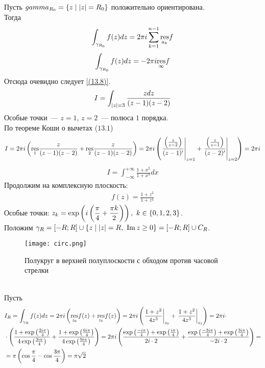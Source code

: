 Пусть $gamma_{R_0} = \{z \mid \left|{z}\right| = R_0\}$ положительно ориентирована.
\\
Тогда
\begin{align*}
  \int_{\gamma_{R_0}}f(z)dz = 2 \pi i \sum_{k=1}^{n-1} \underset{a_k}{\mathrm{res}}f
\end{align*}
\begin{align*}
  \int_{\gamma_{R_0}}f(z)dz = -2 \pi i \underset{\infty}{\mathrm{res}}f
\end{align*}
Отсюда очевидно следует \eqref{(13.8)}.
\Example
\begin{align*}
  I = \int_{\left|{z}\right| = 3}\frac{z dz}{(z-1)(z-2)}
\end{align*}
Особые точки~--- $z=1$, $z=2$~--- полюса $1$ порядка.
\\
По теореме Коши о вычетах ($13.1$)
\begin{align*}
  I = 2 \pi i \left( \underset{1}{\mathrm{res}} \frac{z}{(z-1)(z-2)} +  \underset{2}{\mathrm{res}} \frac{z}{(z-1)(z-2)}\right) = 2 \pi i \left( \left. \frac{\left( \frac{z}{z-2} \right)}{(z-1)'} \right|_{z=1} +  \left. \frac{\left( \frac{z}{z-1} \right)}{(z-2)'} \right|_{z=2} \right) = 2 \pi i
\end{align*}
\Example
\begin{align*}
  I = \int_{-\infty}^{+\infty}\frac{1+x^2}{1+x^4}dx
\end{align*}
Продолжим на комплексную плоскость:
\begin{align*}
  f(z) = \frac{1+z^2}{1+z^4}
\end{align*}
Особые точки: $z_k = \exp \left( i \left( \displaystyle \frac{\pi}{4} + \displaystyle \frac{\pi
          k}{2} \right) \right), \ k \in\{0, 1, 2, 3\}$.
\\
Положим $\gamma_R = \left[ -R;R \right] \cup \{z \mid \left|{z}\right| = R, \ \mathrm{Im}\, z \geq
0 \} = \left[ -R;R \right] \cup C_R$.
\begin{figure}[h!]
		\centering
		\texttt{[image: circ.png]}
    \caption{Полукруг в верхней полуплоскости с обходом против часовой стрелки}
		\label{fig:13.1}
\end{figure}
\\
Пусть 
\begin{align*}
  & I_R = \int_{\gamma_R}f(z)dz = 2 \pi i \left( \underset{z_0}{\mathrm{res}} f(z) +  \underset{z_1}{\mathrm{res}} f(z)\right) = 2 \pi i \left( \left.\frac{1+z^2}{4z^3}\right|_{z_0} + \left.\frac{1+z^2}{4z^3}\right|_{z_1}\right) = 2 \pi i \cdot \\
  & \cdot \left( \frac{1+\exp\left( \frac{2i \pi}{4} \right)}{4 \exp \left( \frac{3i \pi}{4} \right)} +  \frac{1+\exp\left( \frac{6i \pi}{4} \right)}{4 \exp \left( \frac{9i \pi}{4} \right)}\right) = 2 \pi i \left( \frac{\exp\left( \frac{-i\pi}{4} \right) + \exp\left( \frac{i\pi}{4} \right)}{2 i \cdot 2} +  \frac{\exp\left( \frac{-3i\pi}{4} \right) + \exp\left( \frac{3i\pi}{4} \right)}{-2 i \cdot 2}\right) = \\
  & = \pi \left( \cos \frac{\pi}{4} - \cos \frac{3\pi}{4} \right) = \pi \sqrt{2}
\end{align*}
